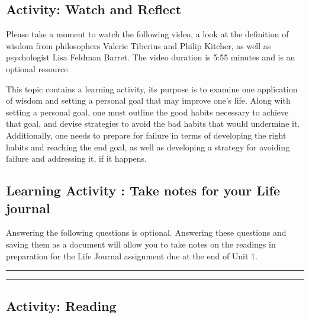 \documentclass[
]{book}
\begin{document}
\hypertarget{activity-watch-and-reflect}{%
\subsection*{Activity: Watch and Reflect}\label{activity-watch-and-reflect}}

\begin{reflect}
Please take a moment to watch the following video, a look at the definition of wisdom from philosophers Valerie Tiberius and Philip Kitcher, as well as psychologist Lisa Feldman Barret. The video duration is 5:55 minutes and is an optional resource.
\end{reflect}

This topic contains a learning activity, its purpose is to examine one application of wisdom and setting a personal goal that may improve one's life. Along with setting a personal goal, one must outline the good habits necessary to achieve that goal, and devise strategies to avoid the bad habits that would undermine it. Additionally, one needs to prepare for failure in terms of developing the right habits and reaching the end goal, as well as developing a strategy for avoiding failure and addressing it, if it happens.

\hypertarget{learning-activity-take-notes-for-your-life-journal}{%
\subsection{Learning Activity : Take notes for your Life journal}\label{learning-activity-take-notes-for-your-life-journal}}

Answering the following questions is optional. Answering these questions and saving them as a document will allow you to take notes on the readings in preparation for the Life Journal assignment due at the end of Unit 1.

\begin{center}\rule{0.5\linewidth}{0.5pt}\end{center}

\begin{center}\rule{0.5\linewidth}{0.5pt}\end{center}

\hypertarget{activity-reading-1}{%
\subsection*{Activity: Reading}\label{activity-reading-1}}
\end{document}
